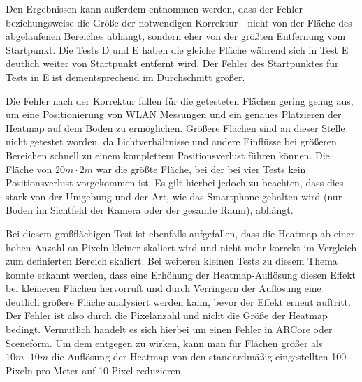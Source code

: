 \documentclass[10pt]{scrartcl}
\begin{document}
Den Ergebnissen kann außerdem entnommen werden, dass der Fehler - beziehungsweise die Größe der notwendigen Korrektur - nicht von der Fläche des abgelaufenen Bereiches abhängt, sondern eher von der größten Entfernung vom Startpunkt. Die Tests D und E haben die gleiche Fläche während sich in Test E deutlich weiter von Startpunkt entfernt wird. Der Fehler des Startpunktes für Tests in E ist dementsprechend im Durchschnitt größer.

Die Fehler nach der Korrektur fallen für die getesteten Flächen gering genug aus, um eine Positionierung von WLAN Messungen und ein genaues Platzieren der Heatmap auf dem Boden zu ermöglichen. Größere Flächen sind an dieser Stelle nicht getestet worden, da Lichtverhältnisse und andere Einflüsse bei größeren Bereichen schnell zu einem komplettem Positionsverlust führen können. Die Fläche von $20m \cdot 2m$ war die größte Fläche, bei der bei vier Tests kein Positionsverlust vorgekommen ist. Es gilt hierbei jedoch zu beachten, dass dies stark von der Umgebung und der Art, wie das Smartphone gehalten wird (nur Boden im Sichtfeld der Kamera oder der gesamte Raum), abhängt.

Bei diesem großflächigen Test ist ebenfalls aufgefallen, dass die Heatmap ab einer hohen Anzahl an Pixeln kleiner skaliert wird und nicht mehr korrekt im Vergleich zum definierten Bereich skaliert. Bei weiteren kleinen Tests zu diesem Thema konnte erkannt werden, dass eine Erhöhung der Heatmap-Auflösung diesen Effekt bei kleineren Flächen hervorruft und durch Verringern der Auflösung eine deutlich größere Fläche analysiert werden kann, bevor der Effekt erneut auftritt. Der Fehler ist also durch die Pixelanzahl und nicht die Größe der Heatmap bedingt. Vermutlich handelt es sich hierbei um einen Fehler in ARCore oder Sceneform. Um dem entgegen zu wirken, kann man für Flächen größer als $10m \cdot 10m$ die Auflösung der Heatmap von den standardmäßig eingestellten 100 Pixeln pro Meter auf 10 Pixel reduzieren. 
\end{document}
